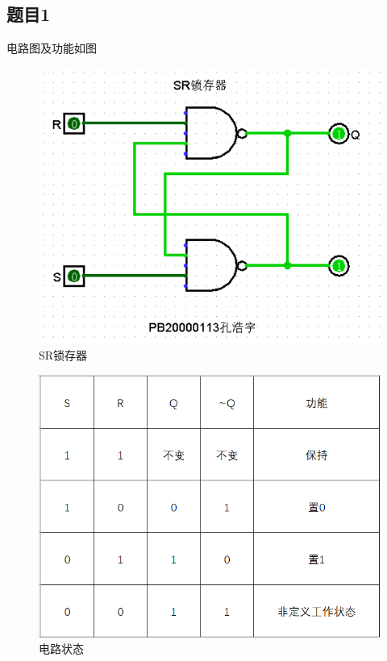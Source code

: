 \documentclass{article}
\begin{document}
    \subsection*{题目1}电路图及功能如图
    \begin{figure}[htbp]
        \centering
        \includegraphics[scale=0.8]{t1.png}
        \caption*{SR锁存器}
    \end{figure}
    \begin{figure}[htbp]
        \centering
        \includegraphics[scale=0.8]{t11.png}
        \caption*{电路状态}
    \end{figure}
\end{document}
